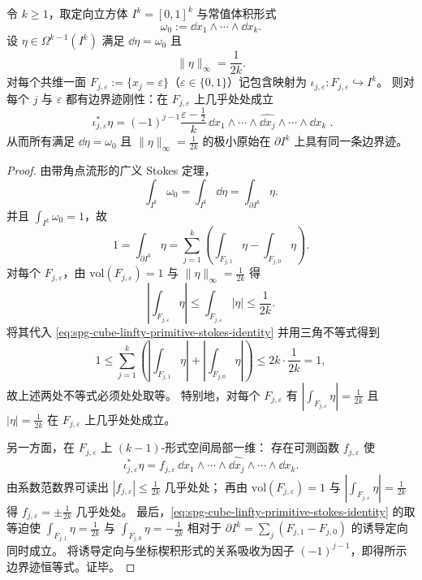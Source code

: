 \begin{theorem}\label{thm:spg-cube-linfty-primitive-boundary-rigidity}
令 \(k\ge 1\)，取定向立方体 \(I^k=[0,1]^k\) 与常值体积形式
\[
\omega_0:=\dd x_1\wedge\cdots\wedge \dd x_k.
\]
设 \(\eta\in\Omega^{k-1}(I^k)\) 满足 \(\dd\eta=\omega_0\) 且
\[
\|\eta\|_\infty=\frac{1}{2k}.
\]
对每个共维一面 \(F_{j,\varepsilon}:=\{x_j=\varepsilon\}\)（\(\varepsilon\in\{0,1\}\)）记包含映射为 \(\iota_{j,\varepsilon}:F_{j,\varepsilon}\hookrightarrow I^k\)。
则对每个 \(j\) 与 \(\varepsilon\) 都有边界迹刚性：在 \(F_{j,\varepsilon}\) 上几乎处处成立
\[
\boxed{\;
\iota_{j,\varepsilon}^\ast\eta
=(-1)^{j-1}\frac{\varepsilon-\tfrac12}{k}\,
\dd x_1\wedge\cdots\wedge\widehat{\dd x_j}\wedge\cdots\wedge \dd x_k\; }.
\]
从而所有满足 \(\dd\eta=\omega_0\) 且 \(\|\eta\|_\infty=\frac{1}{2k}\) 的极小原始在 \(\partial I^k\) 上具有同一条边界迹。
\end{theorem}
\begin{proof}
由带角点流形的广义 Stokes 定理，
\[
\int_{I^k}\omega_0=\int_{I^k}\dd\eta=\int_{\partial I^k}\eta.
\]
并且 \(\int_{I^k}\omega_0=1\)，故
\begin{equation}\label{eq:spg-cube-linfty-primitive-stokes-identity}
1=\int_{\partial I^k}\eta
=\sum_{j=1}^k\left(\int_{F_{j,1}}\eta-\int_{F_{j,0}}\eta\right).
\end{equation}
对每个 \(F_{j,\varepsilon}\)，由 \(\mathrm{vol}(F_{j,\varepsilon})=1\) 与 \(\|\eta\|_\infty=\frac{1}{2k}\) 得
\[
\left|\int_{F_{j,\varepsilon}}\eta\right|
\le \int_{F_{j,\varepsilon}}|\eta|
\le \frac{1}{2k}.
\]
将其代入 \eqref{eq:spg-cube-linfty-primitive-stokes-identity} 并用三角不等式得到
\[
1
\le
\sum_{j=1}^k\left(\left|\int_{F_{j,1}}\eta\right|+\left|\int_{F_{j,0}}\eta\right|\right)
\le 2k\cdot\frac{1}{2k}=1,
\]
故上述两处不等式必须处处取等。
特别地，对每个 \(F_{j,\varepsilon}\) 有
\(
\left|\int_{F_{j,\varepsilon}}\eta\right|=\frac{1}{2k}
\)
且 \(|\eta|=\frac{1}{2k}\) 在 \(F_{j,\varepsilon}\) 上几乎处处成立。
\par
另一方面，在 \(F_{j,\varepsilon}\) 上 \((k-1)\)-形式空间局部一维：
存在可测函数 \(f_{j,\varepsilon}\) 使
\[
\iota_{j,\varepsilon}^\ast\eta
=f_{j,\varepsilon}\,\dd x_1\wedge\cdots\wedge\widehat{\dd x_j}\wedge\cdots\wedge \dd x_k.
\]
由系数范数界可读出 \(|f_{j,\varepsilon}|\le \frac{1}{2k}\) 几乎处处；
再由 \(\mathrm{vol}(F_{j,\varepsilon})=1\) 与 \(\left|\int_{F_{j,\varepsilon}}\eta\right|=\frac{1}{2k}\) 得 \(f_{j,\varepsilon}=\pm\frac{1}{2k}\) 几乎处处。
最后，\eqref{eq:spg-cube-linfty-primitive-stokes-identity} 的取等迫使
\(
\int_{F_{j,1}}\eta=\frac{1}{2k}
\)
与
\(
\int_{F_{j,0}}\eta=-\frac{1}{2k}
\)
相对于 \(\partial I^k=\sum_j(F_{j,1}-F_{j,0})\) 的诱导定向同时成立。
将诱导定向与坐标楔积形式的关系吸收为因子 \((-1)^{j-1}\)，即得所示边界迹恒等式。证毕。
\end{proof}

